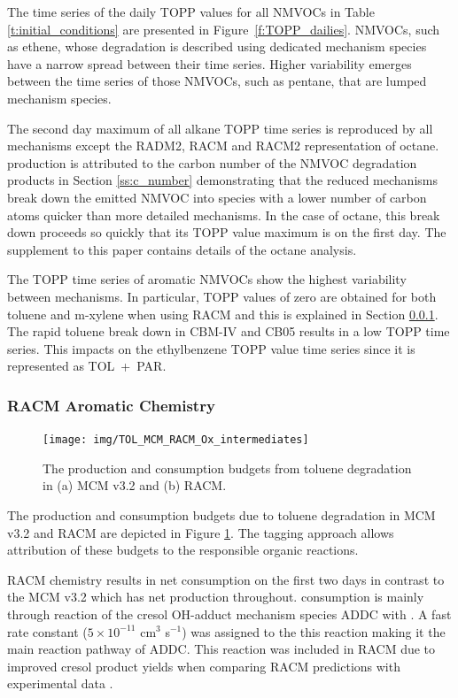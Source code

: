 The time series of the daily TOPP values for all NMVOCs in Table \ref{t:initial_conditions} are presented in \mbox{Figure \ref{f:TOPP_dailies}}. 
NMVOCs, such as ethene, whose degradation is described using dedicated mechanism species have a narrow spread between their time series. 
Higher variability emerges between the time series of those NMVOCs, such as pentane, that are lumped mechanism species.

The second day maximum of all alkane TOPP time series is reproduced by all mechanisms except the RADM2, RACM and RACM2 representation of octane. 
 production is attributed to the carbon number of the NMVOC degradation products in Section \ref{ss:c_number} demonstrating that the reduced mechanisms break down the emitted NMVOC into species with a lower number of carbon atoms quicker than more detailed mechanisms. 
In the case of octane, this break down proceeds so quickly that its TOPP value maximum is on the first day. 
The supplement to this paper contains details of the octane analysis.

The TOPP time series of aromatic NMVOCs show the highest variability between mechanisms. 
In particular, TOPP values of zero are obtained for both toluene and m-xylene when using RACM and this is explained in Section \ref{sss:RACM_aromatic}. 
The rapid toluene break down in CBM-IV and CB05 results in a low TOPP time series. 
This impacts on the ethylbenzene TOPP value time series since it is represented as \mbox{TOL + PAR}.

\subsubsection{RACM Aromatic Chemistry} \label{sss:RACM_aromatic}

\begin{figure}
    \begin{center}
        \texttt{[image: img/TOL\_MCM\_RACM\_Ox\_intermediates]}
    \end{center}
    \caption{The  production and consumption budgets from toluene degradation in (a) MCM v3.2 and (b) RACM.}
    \label{f:TOL_MCM_RACM}
\end{figure}

The  production and consumption budgets due to toluene degradation in MCM v3.2 and RACM are depicted in Figure \ref{f:TOL_MCM_RACM}. 
The tagging approach allows attribution of these budgets to the responsible organic reactions.

RACM chemistry results in net  consumption on the first two days in contrast to the MCM v3.2 which has net  production throughout. 
 consumption is mainly through reaction of the cresol OH-adduct mechanism species ADDC with . 
A fast rate constant ($5 \times 10^{-11}$ cm$^3$ s$^{-1}$) was assigned to the this reaction making it the main reaction pathway of ADDC. 
This reaction was included in RACM due to improved cresol product yields when comparing RACM predictions with experimental data \citep{Stockwell:1997}.

